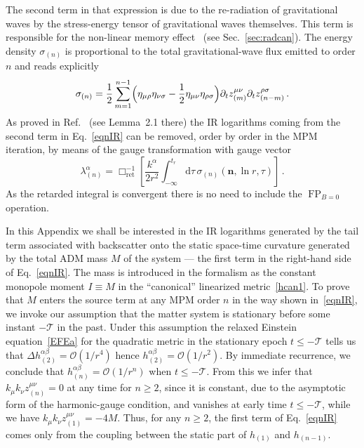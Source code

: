\documentclass[prd,preprint,superscriptaddress,tightenlines,nofootinbib,
  eqsecnum,showpacs]{revtex4}
\newcommand{\ud}{\mathrm{d}}
\begin{document}
The second term in that expression is due to the re-radiation of
gravitational waves by the stress-energy tensor of gravitational waves
themselves. This term is responsible for the non-linear memory
effect~\cite{B90, Chr91, WW91, Th92, BD92, B98quad, F09, F11} (see
Sec.~\ref{sec:radcan}). The energy density $\sigma_{(n)}$ is
proportional to the total gravitational-wave flux emitted to order $n$
and reads explicitly
%
\begin{equation} \label{sigman}
\sigma_{(n)} = \frac{1}{2} \sum_{m=1}^{n-1}
\Bigl(\eta_{\mu\rho}\eta_{\nu\sigma} -
\frac{1}{2}\eta_{\mu\nu}\eta_{\rho\sigma}\Bigr)\partial_t
z^{\mu\nu}_{(m)}\partial_t z^{\rho\sigma}_{(n-m)} \,.
\end{equation}
%
As proved in Ref.~\cite{B87} (see Lemma~2.1 there) the IR logarithms
coming from the second term in Eq.~\eqref{eqnIR} can be removed, order
by order in the MPM iteration, by means of the gauge transformation
with gauge vector
%
\begin{equation} \label{gaugelambdan}
\lambda^\alpha_{(n)} = \Box^{-1}_\mathrm{ret}
\left[\frac{k^\alpha}{2r^2}\!\int_{-\infty}^{t_r}\!\ud
  \tau\,\sigma_{(n)}(\mathbf{n}, \ln r, \tau)\right] \,.
\end{equation}
%
As the retarded integral is convergent there is no need to include the
$\mathop{\mathrm{FP}}_{B=0}$ operation.

In this Appendix we shall be interested in the IR logarithms generated
by the tail term associated with backscatter onto the static
space-time curvature generated by the total ADM mass $M$ of the system
--- the first term in the right-hand side of Eq.~\eqref{eqnIR}. The
mass is introduced in the formalism as the constant monopole moment
$I\equiv M$ in the ``canonical'' linearized metric~\eqref{hcan1}. To
prove that $M$ enters the source term at any MPM order $n$ in the way
shown in~\eqref{eqnIR}, we invoke our assumption that the matter
system is stationary before some instant $-\mathcal{T}$ in the past.
Under this assumption the relaxed Einstein equation~\eqref{EFEa} for
the quadratic metric in the stationary epoch $t\leqslant -\mathcal{T}$
tells us that $\Delta h_{(2)}^{\alpha\beta} = \mathcal{O}(1/r^4)$
hence $h_{(2)}^{\alpha\beta} = \mathcal{O}(1/r^2)$. By immediate
recurrence, we conclude that $h_{(n)}^{\alpha\beta} =
\mathcal{O}(1/r^n)$ when $t\leqslant -\mathcal{T}$. From this we infer
that $k_\mu k_\nu z_{(n)}^{\mu\nu} = 0$ at any time for $n\geqslant
2$, since it is constant, due to the asymptotic form of the
harmonic-gauge condition, and vanishes at early time $t\leqslant
-\mathcal{T}$, while we have $k_\mu k_\nu z_{(1)}^{\mu\nu} = - 4
M$. Thus, for any $n\geqslant 2$, the first term of Eq.~\eqref{eqnIR}
comes only from the coupling between the static part of $h_{(1)}$ and
$h_{(n-1)}$.
\end{document}
